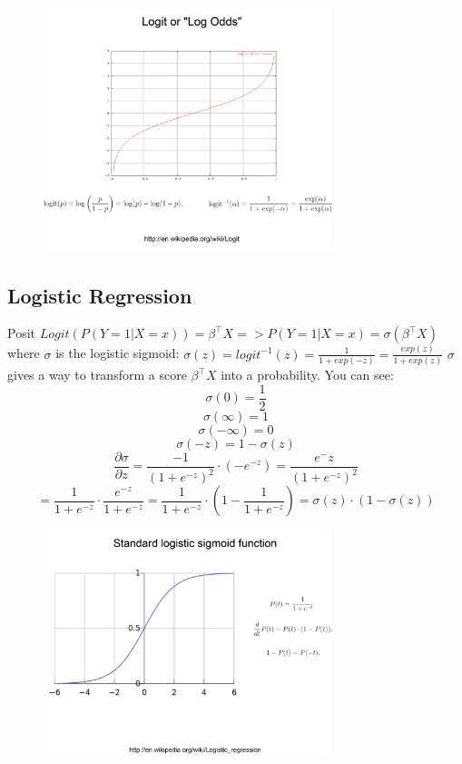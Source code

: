 \documentclass[a4paper]{article}
\begin{document}
\begin{figure}[h!]
\centering
\includegraphics[width=0.75\textwidth]{logit.png}
\end{figure}

\subsection{Logistic Regression}
Posit $Logit(P(Y=1 | X=x)) = \beta^\top X => P(Y=1 | X = x) = \sigma(\beta^\top X)$ \newline
where $\sigma$ is the logistic sigmoid: $\sigma(z) = logit^{-1}(z) = \frac{1}{1 + exp(-z)} = \frac{exp(z)}{1 + exp(z)}$ \newline
$\sigma$ gives a way to transform a score $\beta^\top X$ into a probability. 
You can see:
$$ \sigma(0) = \frac{1}{2}$$
$$ \sigma(\infty) = 1 $$
$$ \sigma(- \infty) = 0 $$
$$ \sigma(- z) = 1 - \sigma(z) $$
$$ \frac{\partial \sigma}{\partial z} = \frac{-1}{(1 + e^{-z})^2} \cdot (-e^{-z}) = \frac{e^-z}{(1 + e^{-z})^2} $$
$$= \frac{1}{1+e^{-z}} \cdot \frac{e^{-z}}{1+e^{-z}}= \frac{1}{1 + e^{-z}} \cdot (1 - \frac{1}{1 + e^{-z}})= \sigma(z) \cdot (1 - \sigma(z)) $$

\begin{figure}[h!]
\centering
\includegraphics[width=0.75\textwidth]{sigmoid.png}
\end{figure}
\end{document}
